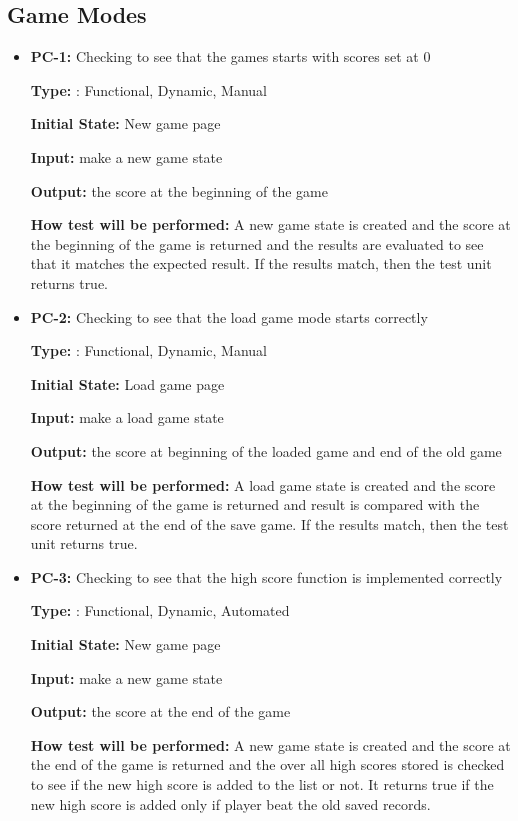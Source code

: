 \documentclass[12pt,letterpaper]{article}
\begin{document}
	\subsection{Game Modes}

\begin{reqbox}
	\begin{itemize}
	\item \textbf{PC-1: }Checking to see that the games starts with scores set at 0

	\textbf{Type: }: Functional, Dynamic, Manual

	\textbf{Initial State: } New game page

	\textbf{Input: } make a new game state
	
	\textbf{Output: }the score at the beginning of the game

	\textbf{How test will be performed: }A new game state is created and the score at the beginning of the game is returned and the results are evaluated to see that it matches the expected result. If the results match, then the test unit returns true.
	\end{itemize}
\end{reqbox}

\begin{reqbox}
	\begin{itemize}
	\item \textbf{PC-2: }Checking to see that the load game mode starts correctly

	\textbf{Type: }: Functional, Dynamic, Manual
	
	\textbf{Initial State: } Load game page
	
	\textbf{Input: } make a load game state
	
	\textbf{Output: }the score at beginning of the loaded game and end of the old game

	\textbf{How test will be performed: }A load game state is created and the score at the beginning of the game is returned and result is compared with the score returned at the end of the save game. If the results match, then the test unit returns true.
	\end{itemize}
\end{reqbox}

\begin{reqbox}
	\begin{itemize}
	\item \textbf{PC-3: }Checking to see that the high score function is implemented correctly

	\textbf{Type: }: Functional, Dynamic, Automated

	\textbf{Initial State: } New game page

	\textbf{Input: } make a new game state

	\textbf{Output: }the score at the end of the game

	\textbf{How test will be performed: }A new game state is created and the score at the end of the game is returned and the over all high scores stored is checked to see if the new high score is added to the list or not. It returns true if the new high score is added only if player beat the old saved records.	
	\end{itemize}
\end{reqbox}
\end{document}
